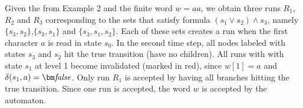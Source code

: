 
\begin{example}
    Given the \AFW from Example 2 and the finite word $w=aa$, we obtain three runs $R_1$, $R_2$ and $R_3$ corresponding to the sets that satisfy formula $(s_1 \vee s_2) \wedge s_3$, namely $\{s_3,s_2\}$,$\{s_3,s_1\}$ and $\{s_3,s_1,s_2\}$. 
    Each of these sets creates a run when the first character $a$ is read in state $s_0$. In the second time step, all nodes labeled with states $s_3$ and $s_2$ hit the true transition (have no children). All runs with with state $s_1$ at level 1 become invalidated (marked in red), since $w[1]=a$ and $\delta(s_1,a)=\fpbf$. Only run $R_1$ is accepted by having all branches hitting the true transition. Since one run is accepted, the word $w$ is accepted by the automaton. 

    
\end{example}
